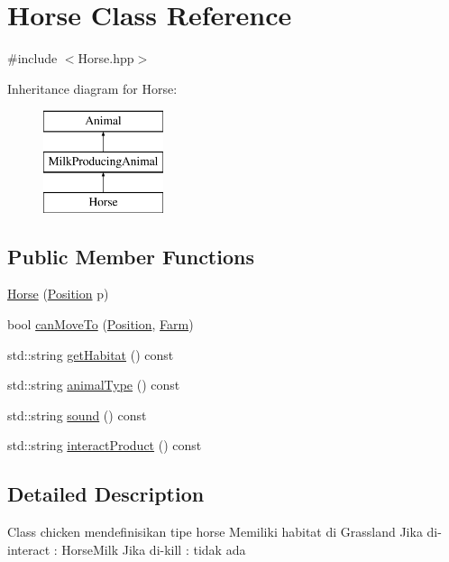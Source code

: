 \hypertarget{class_horse}{}\section{Horse Class Reference}
\label{class_horse}


{\ttfamily \#include $<$Horse.\+hpp$>$}

Inheritance diagram for Horse\+:\begin{figure}[H]
\begin{center}
\leavevmode
\includegraphics[height=3.000000cm]{class_horse}
\end{center}
\end{figure}
\subsection*{Public Member Functions}
\begin{DoxyCompactItemize}
\item 
\mbox{\hyperlink{class_horse_a83786e807b66b375f2db7870c6079989}{Horse}} (\mbox{\hyperlink{class_position}{Position}} p)
\item 
bool \mbox{\hyperlink{class_horse_a4ceaa6057607c0394fe1494dedbdd77f}{can\+Move\+To}} (\mbox{\hyperlink{class_position}{Position}}, \mbox{\hyperlink{class_farm}{Farm}})
\item 
std\+::string \mbox{\hyperlink{class_horse_af1b6722e6b3f0d206087c9f87a01f548}{get\+Habitat}} () const
\item 
std\+::string \mbox{\hyperlink{class_horse_a88104166c335f9a2c389968ab792037b}{animal\+Type}} () const
\item 
std\+::string \mbox{\hyperlink{class_horse_ae1a6e7e8d7e887b875dcfdad9b0fb3b5}{sound}} () const
\item 
std\+::string \mbox{\hyperlink{class_horse_aa6ff6a5a2cb301ccc853cf3c939ee070}{interact\+Product}} () const
\end{DoxyCompactItemize}


\subsection{Detailed Description}
Class chicken mendefinisikan tipe horse Memiliki habitat di Grassland Jika di-\/interact \+: Horse\+Milk Jika di-\/kill \+: tidak ada 

